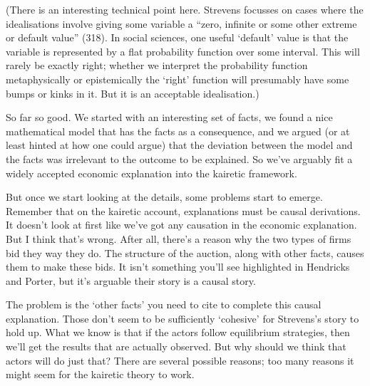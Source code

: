 (There is an interesting technical point here. Strevens focusses on cases where the idealisations involve giving some variable a ``zero, infinite or some other extreme or default value'' (318). In social sciences, one useful `default' value is that the variable is represented by a flat probability function over some interval. This will rarely be exactly right; whether we interpret the probability function metaphysically or epistemically the `right' function will presumably have some bumps or kinks in it. But it is an acceptable idealisation.)

So far so good. We started with an interesting set of facts, we found a nice mathematical model that has the facts as a consequence, and we argued (or at least hinted at how one could argue) that the deviation between the model and the facts was irrelevant to the outcome to be explained. So we've arguably fit a widely accepted economic explanation into the kairetic framework.

But once we start looking at the details, some problems start to emerge. Remember that on the kairetic account, explanations must be causal derivations. It doesn't look at first like we've got any causation in the economic explanation. But I think that's wrong. After all, there's a reason why the two types of firms bid they way they do. The structure of the auction, along with other facts, causes them to make these bids. It isn't something you'll see highlighted in Hendricks and Porter, but it's arguable their story is a causal story.

The problem is the `other facts' you need to cite to complete this causal explanation. Those don't seem to be sufficiently `cohesive' for Strevens's story to hold up. What we know is that if the actors follow equilibrium strategies, then we'll get the results that are actually observed. But why should we think that actors will do just that? There are several possible reasons; too many reasons it might seem for the kairetic theory to work.

